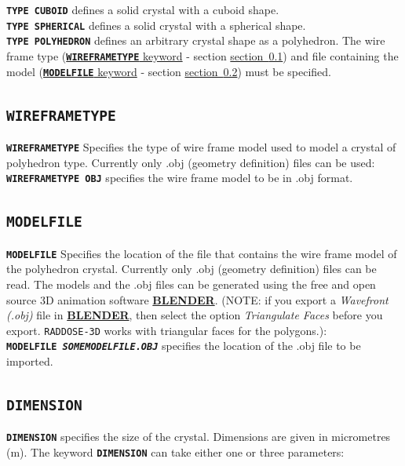 \documentclass[a4paper]{article}
\newcommand{\RD}{\texttt{RADDOSE-3D}\xspace}
\newcommand{\Keyword}[1]{\texttt{\textbf{#1}}\xspace}
\newcommand{\SB}{\\[0.2em]}
\begin{document}
\noindent \Keyword{TYPE CUBOID}
defines a solid crystal with a cuboid shape.\SB

\noindent \Keyword{TYPE SPHERICAL}
defines a solid crystal with a spherical shape.\SB

\noindent \Keyword{TYPE POLYHEDRON}
defines an arbitrary crystal shape as a polyhedron. The wire frame type (\hyperref[wireframetype]{\Keyword{WIREFRAMETYPE} keyword} - section \hyperref[wireframetype]{section~\ref*{wireframetype}}) and file containing the model (\hyperref[modelfile]{\Keyword{MODELFILE} keyword} - section \hyperref[modelfile]{section~\ref*{modelfile}}) must be specified.\SB

\subsection{\Keyword{WIREFRAMETYPE}}
\label{wireframetype}
\Keyword{WIREFRAMETYPE} Specifies the type of wire frame model used to model a crystal of polyhedron type.
Currently only .obj (geometry definition) files can be used:\SB

\noindent \Keyword{WIREFRAMETYPE OBJ}
specifies the wire frame model to be in .obj format. \SB

\subsection{\Keyword{MODELFILE}}
\label{modelfile}
\Keyword{MODELFILE} Specifies the location of the file that contains the wire frame model of the polyhedron crystal.
Currently only .obj (geometry definition) files can be read. The models and the .obj files can be generated using the free and open source 3D animation software \href{http://www.blender.org/}{\textbf{BLENDER}}. (NOTE: if you export a \textit{Wavefront (.obj)} file in \href{http://www.blender.org/}{\textbf{BLENDER}}, then select the option \textit{Triangulate Faces} before you export. \RD works with triangular faces for the polygons.):\SB

\noindent \Keyword{MODELFILE \textit{SOMEMODELFILE.OBJ}}
specifies the location of the .obj file to be imported. \SB


\subsection{\Keyword{DIMENSION}}
\label{crystaldimension}
\Keyword{DIMENSION} specifies the size of the crystal.
Dimensions are given in micrometres (\hbox{\textmu}m).
The keyword \Keyword{DIMENSION} can take either one or three parameters:\SB
\end{document}
